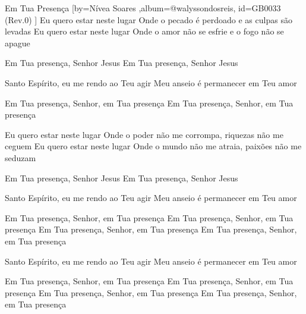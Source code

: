 \beginsong
{Em Tua Presença %
}[by={Nívea Soares %
},album={@walyssondosreis},
id={GB0033 %
(Rev.0) %
}]
Eu quero estar neste lugar
Onde o pecado é perdoado e as culpas são levadas
Eu quero estar neste lugar
Onde o amor não se esfrie e o fogo não se apague

Em Tua presença, Senhor Jesus
Em Tua presença, Senhor Jesus

Santo Espírito, eu me rendo ao Teu agir
Meu anseio é permanecer em Teu amor

Em Tua presença, Senhor, em Tua presença
Em Tua presença, Senhor, em Tua presença

Eu quero estar neste lugar
Onde o poder não me corrompa, riquezas não me ceguem
Eu quero estar neste lugar
Onde o mundo não me atraia, paixões não me seduzam

Em Tua presença, Senhor Jesus
Em Tua presença, Senhor Jesus

Santo Espírito, eu me rendo ao Teu agir
Meu anseio é permanecer em Teu amor

Em Tua presença, Senhor, em Tua presença
Em Tua presença, Senhor, em Tua presença
Em Tua presença, Senhor, em Tua presença
Em Tua presença, Senhor, em Tua presença

Santo Espírito, eu me rendo ao Teu agir
Meu anseio é permanecer em Teu amor

Em Tua presença, Senhor, em Tua presença
Em Tua presença, Senhor, em Tua presença
Em Tua presença, Senhor, em Tua presença
Em Tua presença, Senhor, em Tua presença


